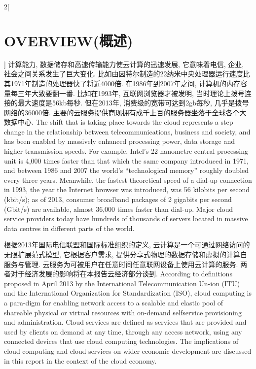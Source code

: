 \documentclass[a4paper, UTF8, 12pt]{article}
\begin{document}
\begin{paracol}{2}[\section{OVERVIEW(概述)}]
    \switchcolumn*
    计算能力, 数据储存和高速传输能力使云计算的迅速发展, 它意味着电信, 企业, 社会之间关系发生了巨大变化. 比如由因特尔制造的22纳米中央处理器运行速度比其1971年制造的处理器快了将近4000倍. 在1986年到2007年之间, 计算机的内存容量每三年大致要翻一番. 比如在1993年, 互联网浏览器才被发明, 当时理论上拨号连接的最大速度是56kb每秒. 但在2013年, 消费级的宽带可达到2gb每秒, 几乎是拨号网络的36000倍. 主要的云服务提供商现拥有成千上百的服务器坐落于全球各个大数据中心.
    \switchcolumn
    The shift that is taking place towards the cloud represents a step change in the relationship between telecommunications, business and society, and has been enabled by massively enhanced processing power, data storage and higher transmission speeds. For example, Intel’s 22-nanometre central processing unit is 4,000 times faster than that which the same company introduced in 1971, and between 1986 and 2007 the world’s “technological memory” roughly doubled every three years. Meanwhile, the fastest theoretical speed of a dial-up connection in 1993, the year the Internet browser was introduced, was 56 kilobits per second (kbit/s); as of 2013, consumer broadband packages of 2 gigabits per second (Gbit/s) are available, almost 36,000 times faster than dial-up. Major cloud service providers today have hundreds of thousands of servers located in massive data centres in different parts of the world. 

    \switchcolumn*
    根据2013年国际电信联盟和国际标准组织的定义, 云计算是一个可通过网络访问的无限扩展范式模型, 它根据客户需求, 提供分享式物理的数据存储和虚拟的计算自服务与管理. 云服务为可被用户在任意时间任意联网设备上使用云计算的服务. 两者对于经济发展的影响将在本报告云经济部分谈到.
    \switchcolumn
    According to definitions proposed in April 2013 by the International Telecommunication Un-ion (ITU) and the International Organization for Standardization (ISO), cloud computing is a para-digm for enabling network access to a scalable and elastic pool of shareable physical or virtual resources with on-demand selfservice provisioning and administration. Cloud services are defined as services that are provided and used by clients on demand at any time, through any access network, using any connected devices that use cloud computing technologies. The implications of cloud computing and cloud services on wider economic development are discussed in this report in the context of the cloud economy. 

    \switchcolumn*
    \paragraph{} 
    \switchcolumn

\end{paracol}
\end{document}
